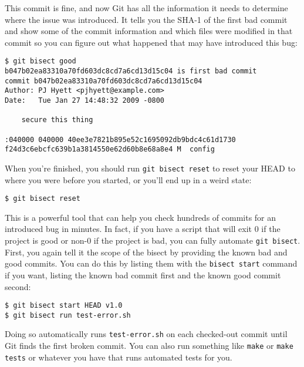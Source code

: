 \documentclass[a4paper]{book}
\begin{document}
This commit is fine, and now Git has all the information it needs to determine where the issue was introduced. It tells you the SHA-1 of the first bad commit and show some of the commit information and which files were modified in that commit so you can figure out what happened that may have introduced this bug:

\begin{shaded}\begin{verbatim}
$ git bisect good
b047b02ea83310a70fd603dc8cd7a6cd13d15c04 is first bad commit
commit b047b02ea83310a70fd603dc8cd7a6cd13d15c04
Author: PJ Hyett <pjhyett@example.com>
Date:   Tue Jan 27 14:48:32 2009 -0800

    secure this thing

:040000 040000 40ee3e7821b895e52c1695092db9bdc4c61d1730
f24d3c6ebcfc639b1a3814550e62d60b8e68a8e4 M  config
\end{verbatim}\end{shaded}

When you're finished, you should run \texttt{git bisect reset} to reset your HEAD to where you were before you started, or you'll end up in a weird state:

\begin{shaded}\begin{verbatim}
$ git bisect reset
\end{verbatim}\end{shaded}

This is a powerful tool that can help you check hundreds of commits for an introduced bug in minutes. In fact, if you have a script that will exit 0 if the project is good or non-0 if the project is bad, you can fully automate \texttt{git bisect}. First, you again tell it the scope of the bisect by providing the known bad and good commits. You can do this by listing them with the \texttt{bisect start} command if you want, listing the known bad commit first and the known good commit second:

\begin{shaded}\begin{verbatim}
$ git bisect start HEAD v1.0
$ git bisect run test-error.sh
\end{verbatim}\end{shaded}

Doing so automatically runs \texttt{test-error.sh} on each checked-out commit until Git finds the first broken commit. You can also run something like \texttt{make} or \texttt{make tests} or whatever you have that runs automated tests for you.
\end{document}
